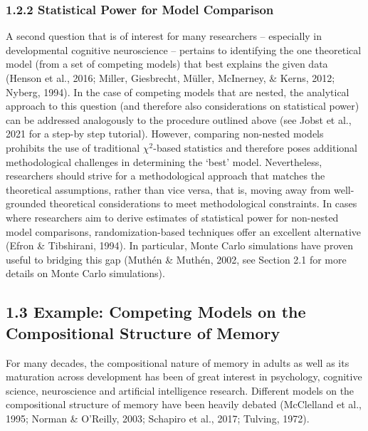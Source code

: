 \documentclass[
  man,floatsintext]{apa6}
\begin{document}
\hypertarget{statistical-power-for-model-comparison}{%
\subsubsection{1.2.2 Statistical Power for Model Comparison}\label{statistical-power-for-model-comparison}}

A second question that is of interest for many researchers -- especially in developmental cognitive neuroscience -- pertains to identifying the one theoretical model (from a set of competing models) that best explains the given data (Henson et al., 2016; Miller, Giesbrecht, Müller, McInerney, \& Kerns, 2012; Nyberg, 1994). In the case of competing models that are nested, the analytical approach to this question (and therefore also considerations on statistical power) can be addressed analogously to the procedure outlined above (see Jobst et al., 2021 for a step-by step tutorial). However, comparing non-nested models prohibits the use of traditional \(\chi^2\)-based statistics and therefore poses additional methodological challenges in determining the `best' model. Nevertheless, researchers should strive for a methodological approach that matches the theoretical assumptions, rather than vice versa, that is, moving away from well-grounded theoretical considerations to meet methodological constraints. In cases where researchers aim to derive estimates of statistical power for non-nested model comparisons, randomization-based techniques offer an excellent alternative (Efron \& Tibshirani, 1994). In particular, Monte Carlo simulations have proven useful to bridging this gap (Muthén \& Muthén, 2002, see Section 2.1 for more details on Monte Carlo simulations).

\hypertarget{example-competing-models-on-the-compositional-structure-of-memory}{%
\subsection{1.3 Example: Competing Models on the Compositional Structure of Memory}\label{example-competing-models-on-the-compositional-structure-of-memory}}

For many decades, the compositional nature of memory in adults as well as its maturation across development has been of great interest in psychology, cognitive science, neuroscience and artificial intelligence research. Different models on the compositional structure of memory have been heavily debated (McClelland et al., 1995; Norman \& O'Reilly, 2003; Schapiro et al., 2017; Tulving, 1972).
\end{document}
